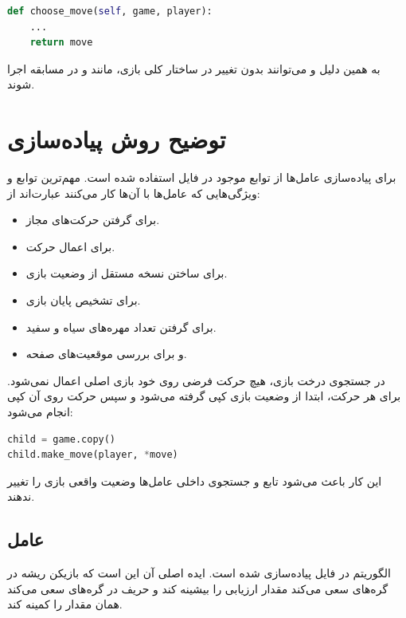 \documentclass[10.5pt]{exam}
\begin{document}
\begin{latin}
\begin{lstlisting}[language=Python]
def choose_move(self, game, player):
    ...
    return move
\end{lstlisting}
\end{latin}

به همین دلیل
و
می‌توانند بدون تغییر در ساختار کلی بازی، مانند
و
در مسابقه اجرا شوند.

\section{توضیح روش پیاده‌سازی}
برای پیاده‌سازی عامل‌ها از توابع موجود در فایل
استفاده شده است. مهم‌ترین توابع و ویژگی‌هایی که عامل‌ها با آن‌ها کار می‌کنند عبارت‌اند از:

\begin{itemize}
    \item {} برای گرفتن حرکت‌های مجاز.
    \item {} برای اعمال حرکت.
    \item {} برای ساختن نسخه مستقل از وضعیت بازی.
    \item {} برای تشخیص پایان بازی.
    \item {} برای گرفتن تعداد مهره‌های سیاه و سفید.
    \item {} و  برای بررسی موقعیت‌های صفحه.
\end{itemize}

در جستجوی درخت بازی، هیچ حرکت فرضی روی خود بازی اصلی اعمال نمی‌شود. برای هر حرکت، ابتدا از وضعیت بازی کپی گرفته می‌شود و سپس حرکت روی آن کپی انجام می‌شود:

\begin{latin}
\begin{lstlisting}[language=Python]
child = game.copy()
child.make_move(player, *move)
\end{lstlisting}
\end{latin}

این کار باعث می‌شود تابع
و جستجوی داخلی عامل‌ها وضعیت واقعی بازی را تغییر ندهند.

\subsection{عامل }
الگوریتم
در فایل
پیاده‌سازی شده است. ایده اصلی آن این است که بازیکن ریشه در گره‌های
سعی می‌کند مقدار ارزیابی را بیشینه کند و حریف در گره‌های
سعی می‌کند همان مقدار را کمینه کند.
\end{document}
